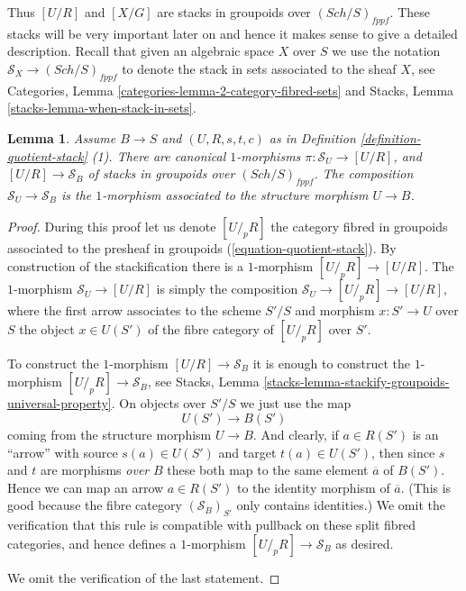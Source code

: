 \documentclass{stacks-project}
\theoremstyle{plain}
\newtheorem{lemma}[subsection]{Lemma}
\theoremstyle{definition}
\theoremstyle{remark}
\numberwithin{equation}{subsection}
\def\Sch{\mathit{Sch}}
\begin{document}
\noindent
Thus $[U/R]$ and $[X/G]$ are stacks in groupoids over
$(\Sch/S)_{fppf}$. These stacks will be very important later
on and hence it makes sense to give a detailed description.
Recall that given an algebraic space $X$ over $S$ we use the
notation $\mathcal{S}_X \to (\Sch/S)_{fppf}$ to denote
the stack in sets associated to the sheaf $X$, see
Categories, Lemma \ref{categories-lemma-2-category-fibred-sets}
and
Stacks, Lemma \ref{stacks-lemma-when-stack-in-sets}.

\begin{lemma}
\label{lemma-quotient-stack-arrows}
Assume $B \to S$ and $(U, R, s, t, c)$ as in
Definition \ref{definition-quotient-stack} (1).
There are canonical $1$-morphisms
$\pi : \mathcal{S}_U \to [U/R]$, and $[U/R] \to \mathcal{S}_B$
of stacks in groupoids over $(\Sch/S)_{fppf}$.
The composition $\mathcal{S}_U \to \mathcal{S}_B$ is the $1$-morphism
associated to the structure morphism $U \to B$.
\end{lemma}

\begin{proof}
During this proof let us denote $[U/_{\!p}R]$ the category fibred in
groupoids associated to the presheaf in groupoids
(\ref{equation-quotient-stack}). By construction of the stackification
there is a $1$-morphism $[U/_{\!p}R] \to [U/R]$.
The $1$-morphism $\mathcal{S}_U \to [U/R]$ is simply the composition
$\mathcal{S}_U \to [U/_{\!p}R] \to [U/R]$, where the first arrow
associates to the scheme $S'/S$ and morphism $x : S' \to U$ over $S$
the object $x \in U(S')$ of the fibre category of $[U/_{\!p}R]$
over $S'$.

\medskip\noindent
To construct the $1$-morphism $[U/R] \to \mathcal{S}_B$ it is enough to
construct the $1$-morphism $[U/_{\!p}R] \to \mathcal{S}_B$, see
Stacks, Lemma \ref{stacks-lemma-stackify-groupoids-universal-property}.
On objects over $S'/S$ we just use the map
$$
U(S') \longrightarrow B(S')
$$
coming from the structure morphism $U \to B$.
And clearly, if $a \in R(S')$ is an ``arrow'' with source
$s(a) \in U(S')$ and target $t(a) \in U(S')$, then since
$s$ and $t$ are morphisms {\it over} $B$ these both
map to the same element $\overline{a}$ of $B(S')$. Hence we can map an arrow
$a \in R(S')$ to the identity morphism of $\overline{a}$. (This is
good because the fibre category $(\mathcal{S}_B)_{S'}$ only contains
identities.) We omit the verification that this rule is compatible with
pullback on these split fibred categories, and hence defines a
$1$-morphism $[U/_{\!p}R] \to \mathcal{S}_B$ as desired.

\medskip\noindent
We omit the verification of the last statement.
\end{proof}
\end{document}
